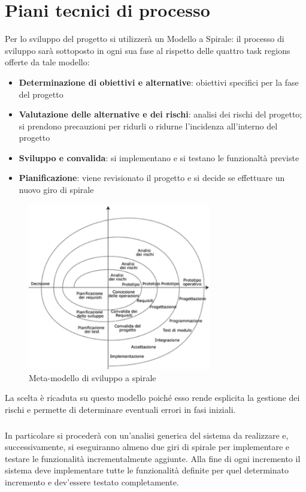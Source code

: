 \chapter{Piani tecnici di processo}

Per lo sviluppo del progetto si utilizzerà un Modello a Spirale: il processo di sviluppo sarà sottoposto in ogni sua fase al rispetto delle quattro task regions offerte da tale modello:
\begin{itemize}
 \item \textbf{Determinazione di obiettivi e alternative}: obiettivi specifici per la fase del progetto
 \item \textbf{Valutazione delle alternative e dei rischi}: analisi dei rischi del progetto; si prendono precauzioni per ridurli o ridurne l’incidenza all’interno del progetto
 \item \textbf{Sviluppo e convalida}: si implementano e si testano le funzionaltà previste
 \item \textbf{Pianificazione}: viene revisionato il progetto e si decide se effettuare un nuovo giro di spirale
\end{itemize}

\begin{figure}[ht]
\centering
\includegraphics[width=8cm]{img/spirale.png} 
\caption{Meta-modello di sviluppo a spirale}
\label{spiralModel}
\end{figure}

La scelta è ricaduta su questo modello poiché esso rende esplicita la gestione dei rischi e permette di determinare eventuali errori in fasi iniziali.
\paragraph{} In particolare si procederà con un'analisi generica del sistema da realizzare e, successivamente, si eseguiranno almeno due giri di spirale per implementare e testare le funzionalità incrementalmente aggiunte. Alla fine di ogni incremento il sistema deve implementare tutte le funzionalità definite per quel determinato incremento e dev'essere testato completamente.
